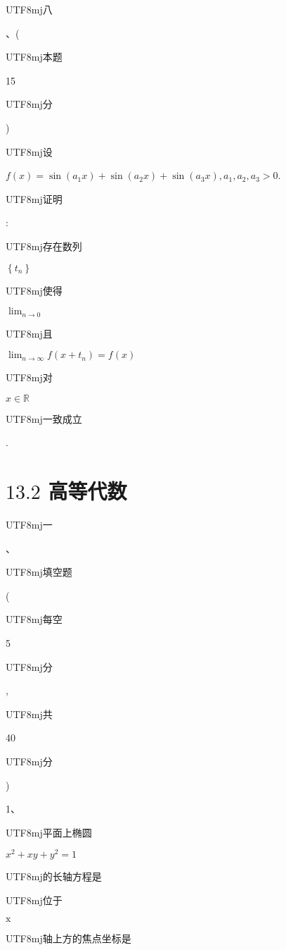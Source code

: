 \documentclass[10pt]{article}
\begin{document}
\begin{CJK}{UTF8}{mj}八\end{CJK}、(\begin{CJK}{UTF8}{mj}本题\end{CJK} 15 \begin{CJK}{UTF8}{mj}分\end{CJK}) \begin{CJK}{UTF8}{mj}设\end{CJK} $f(x)=\sin \left(a_{1} x\right)+\sin \left(a_{2} x\right)+\sin \left(a_{3} x\right), a_{1}, a_{2}, a_{3}>0$. \begin{CJK}{UTF8}{mj}证明\end{CJK}: \begin{CJK}{UTF8}{mj}存在数列\end{CJK} $\left\{t_{n}\right\}$ \begin{CJK}{UTF8}{mj}使得\end{CJK} $\lim _{n \rightarrow 0}$ \begin{CJK}{UTF8}{mj}且\end{CJK} $\lim _{n \rightarrow \infty} f\left(x+t_{n}\right)=f(x)$ \begin{CJK}{UTF8}{mj}对\end{CJK} $x \in \mathbb{R}$ \begin{CJK}{UTF8}{mj}一致成立\end{CJK}.

\section{$13.2$ 高等代数}
\begin{CJK}{UTF8}{mj}一\end{CJK}、\begin{CJK}{UTF8}{mj}填空题\end{CJK} (\begin{CJK}{UTF8}{mj}每空\end{CJK} 5 \begin{CJK}{UTF8}{mj}分\end{CJK}, \begin{CJK}{UTF8}{mj}共\end{CJK} 40 \begin{CJK}{UTF8}{mj}分\end{CJK})

1、\begin{CJK}{UTF8}{mj}平面上椭圆\end{CJK} $x^{2}+x y+y^{2}=1$ \begin{CJK}{UTF8}{mj}的长轴方程是\end{CJK} \begin{CJK}{UTF8}{mj}位于\end{CJK} $\mathrm{x}$ \begin{CJK}{UTF8}{mj}轴上方的焦点坐标是\end{CJK}
\end{document}
